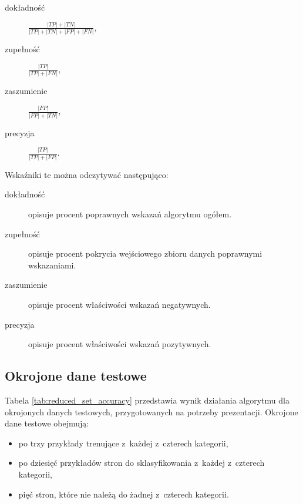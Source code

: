 \documentclass[a4paper,11pt]{article}
\begin{document}
\begin{description}
    \item[dokładność] $\frac{|TP| + |TN|}{|TP| + |TN| + |FP| + |FN|}$,
    \item[zupełność] $\frac{|TP|}{|TP| + |FN|}$,
    \item[zaszumienie] $\frac{|FP|}{|FP| + |TN|}$,
    \item[precyzja] $\frac{|TP|}{|TP| + |FP|}$.
\end{description}

Wskaźniki te można odczytywać następująco:

\begin{description}
    \item[dokładność] opisuje procent poprawnych wskazań algorytmu ogółem.
    \item[zupełność] opisuje procent pokrycia wejściowego zbioru danych poprawnymi wskazaniami.
    \item[zaszumienie] opisuje procent właściwości wskazań negatywnych.
    \item[precyzja] opisuje procent właściwości wskazań pozytywnych.
\end{description}

\subsection{Okrojone dane testowe}

Tabela \ref{tab:reduced_set_accuracy} przedstawia wynik działania algorytmu dla okrojonych danych testowych, przygotowanych na potrzeby prezentacji. Okrojone dane testowe obejmują:

\begin{itemize}
    \item po trzy przykłady trenujące z~każdej z~czterech kategorii,
    \item po dziesięć przykładów stron do sklasyfikowania z~każdej z~czterech kategorii,
    \item pięć stron, które nie należą do żadnej z~czterech kategorii.
\end{itemize}
\end{document}

